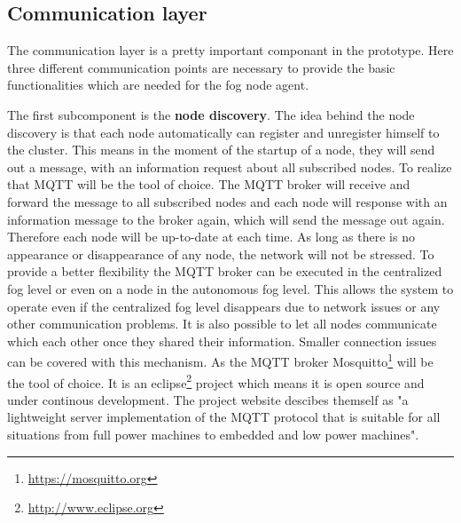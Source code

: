\subsection{Communication layer}
\label{subsection:CommunicationLayer}
The communication layer is a pretty important componant in the prototype.
Here three different communication points are necessary to provide the basic functionalities which are needed for the fog node agent.

The first subcomponent is the \textbf{node discovery}.
The idea behind the node discovery is that each node automatically can register and unregister himself to the cluster.
This means in the moment of the startup of a node, they will send out a message, with an information request about all subscribed nodes.
To realize that \ac{MQTT} will be the tool of choice.
The \ac{MQTT} broker will receive and forward the message to all subscribed nodes and each node will response with an information message to the broker again, which will send the message out again.
Therefore each node will be up-to-date at each time.
As long as there is no appearance or disappearance of any node, the network will not be stressed.
To provide a better flexibility the \ac{MQTT} broker can be executed in the centralized fog level or even on a node in the autonomous fog level.
This allows the system to operate even if the centralized fog level disappears due to network issues or any other communication problems.
It is also possible to let all nodes communicate which each other once they shared their information.
Smaller connection issues can be covered with this mechanism.
As the \ac{MQTT} broker Mosquitto\footnote{\url{https://mosquitto.org}} will be the tool of choice.
It is an eclipse\footnote{\url{http://www.eclipse.org}} project which means it is open source and under continous development.
The project website descibes themself as "a lightweight server implementation of the MQTT protocol that is suitable for all situations from full power machines to embedded and low power machines"\autocite{Eclipse:Mosquitto}.


